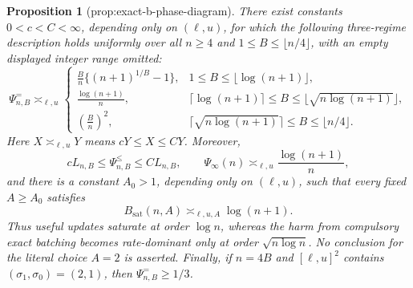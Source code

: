 \documentclass{article}
\newtheorem{proposition}{Proposition}
\begin{document}
\begin{proposition}[prop:exact-b-phase-diagram]\label{prop:exact-b-phase-diagram}
There exist constants \(0<c<C<\infty\), depending only on \((\ell,u)\), for which the following three-regime description holds uniformly over all \(n\geq4\) and \(1\leq B\leq\lfloor n/4\rfloor\), with an empty displayed integer range omitted:
\[
\Psi^{=}_{n,B}\asymp_{\ell,u}
\begin{cases}
\displaystyle \frac{B}{n}\bigl\{(n+1)^{1/B}-1\bigr\},
&1\leq B\leq\lfloor\log(n+1)\rfloor,\\[6pt]
\displaystyle \frac{\log(n+1)}{n},
&\lceil\log(n+1)\rceil\leq B\leq
 \lfloor\sqrt{n\log(n+1)}\rfloor,\\[6pt]
\displaystyle \left(\frac{B}{n}\right)^2,
&\lceil\sqrt{n\log(n+1)}\rceil\leq B\leq\lfloor n/4\rfloor.
\end{cases}
\]
Here \(X\asymp_{\ell,u}Y\) means \(cY\leq X\leq CY\). Moreover,
\[
cL_{n,B}\leq\Psi^{\leq}_{n,B}\leq CL_{n,B},
\qquad
\Psi_\infty(n)\asymp_{\ell,u}\frac{\log(n+1)}{n},
\]
and there is a constant \(A_0>1\), depending only on \((\ell,u)\), such that every fixed \(A\geq A_0\) satisfies
\[
B_{\mathrm{sat}}(n,A)\asymp_{\ell,u,A}\log(n+1).
\]
Thus useful updates saturate at order \(\log n\), whereas the harm from compulsory exact batching becomes rate-dominant only at order \(\sqrt{n\log n}\). No conclusion for the literal choice \(A=2\) is asserted. Finally, if \(n=4B\) and \([\ell,u]^2\) contains \((\sigma_1,\sigma_0)=(2,1)\), then \(\Psi^{=}_{n,B}\geq1/3\).
\end{proposition}
\end{document}
